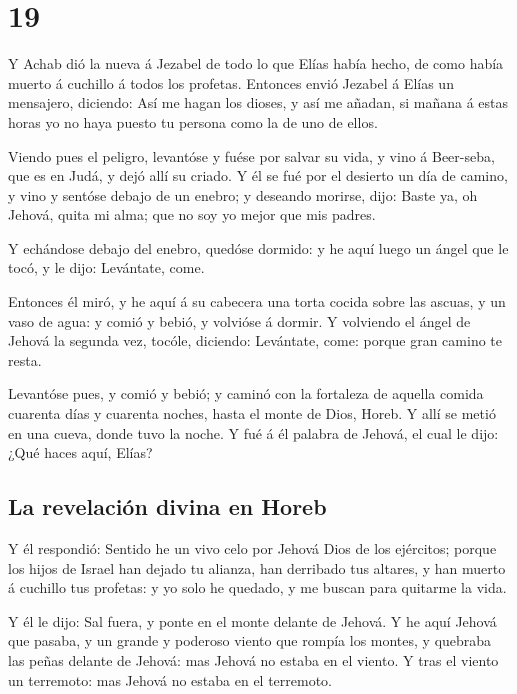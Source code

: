 \hypertarget{section-11-19}{%
\section{19}\label{section-11-19}}

 Y Achab dió la nueva á Jezabel de todo lo que Elías había
hecho, de como había muerto á cuchillo á todos los profetas.
 Entonces envió Jezabel á Elías un mensajero, diciendo:
Así me hagan los dioses, y así me añadan, si mañana á estas horas yo no
haya puesto tu persona como la de uno de ellos.

 Viendo pues el peligro, levantóse y fuése por salvar su
vida, y vino á Beer-seba, que es en Judá, y dejó allí su criado.
 Y él se fué por el desierto un día de camino, y vino y
sentóse debajo de un enebro; y deseando morirse, dijo: Baste ya, oh
Jehová, quita mi alma; que no soy yo mejor que mis padres.

 Y echándose debajo del enebro, quedóse dormido: y he aquí
luego un ángel que le tocó, y le dijo: Levántate, come.

 Entonces él miró, y he aquí á su cabecera una torta
cocida sobre las ascuas, y un vaso de agua: y comió y bebió, y volvióse
á dormir.  Y volviendo el ángel de Jehová la segunda vez,
tocóle, diciendo: Levántate, come: porque gran camino te resta.

 Levantóse pues, y comió y bebió; y caminó con la
fortaleza de aquella comida cuarenta días y cuarenta noches, hasta el
monte de Dios, Horeb.  Y allí se metió en una cueva, donde
tuvo la noche. Y fué á él palabra de Jehová, el cual le dijo: ¿Qué haces
aquí, Elías?

\hypertarget{la-revelaciuxf3n-divina-en-horeb}{%
\subsection{La revelación divina en
Horeb}\label{la-revelaciuxf3n-divina-en-horeb}}

 Y él respondió: Sentido he un vivo celo por Jehová Dios
de los ejércitos; porque los hijos de Israel han dejado tu alianza, han
derribado tus altares, y han muerto á cuchillo tus profetas: y yo solo
he quedado, y me buscan para quitarme la vida.

 Y él le dijo: Sal fuera, y ponte en el monte delante de
Jehová. Y he aquí Jehová que pasaba, y un grande y poderoso viento que
rompía los montes, y quebraba las peñas delante de Jehová: mas Jehová no
estaba en el viento. Y tras el viento un terremoto: mas Jehová no estaba
en el terremoto.

